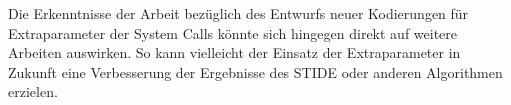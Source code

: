 Die Erkenntnisse der Arbeit bezüglich des Entwurfs neuer Kodierungen für Extraparameter der System Calls könnte sich hingegen direkt auf weitere Arbeiten auswirken.
So kann vielleicht der Einsatz der Extraparameter in Zukunft eine Verbesserung der Ergebnisse des \ac{STIDE} oder anderen Algorithmen erzielen.
